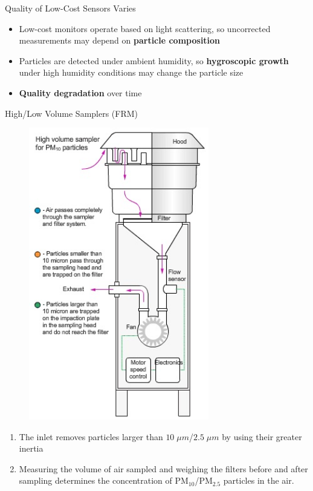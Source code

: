 \documentclass[handout]{beamer} %
\begin{document}
\begin{frame}{Quality of Low-Cost Sensors Varies}
    \begin{itemize}
        \item Low-cost monitors operate based on light scattering, so uncorrected measurements may depend on \textbf{particle composition}
        \item Particles are detected under ambient humidity, so \textbf{hygroscopic growth} under high humidity conditions may change the particle size
        \item \textbf{Quality degradation} over time
    \end{itemize}
\end{frame}

\begin{frame}{High/Low Volume Samplers (FRM)}
    \begin{minipage}[t]{0.49\textwidth}
        \begin{figure}
        \centering
        \includegraphics[width=0.7\textwidth]{img/appendix/Aim2/hivol-sampler.jpg}
    \end{figure}
    \end{minipage}
    \begin{minipage}[t]{0.49\textwidth}
        \begin{enumerate}
            \item The inlet removes particles larger than $10\;\mu m$/$2.5\;\mu m$ by using their greater inertia
            \item Measuring the volume of air sampled and weighing the filters before and after sampling determines the concentration of PM$_{10}$/PM$_{2.5}$ particles in the air.
        \end{enumerate}
    \end{minipage}
\end{frame}
\end{document}
